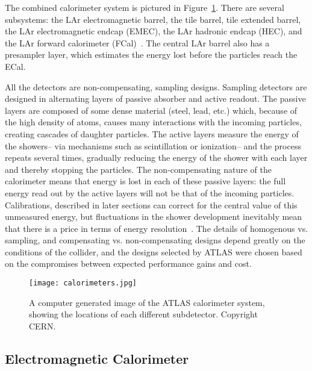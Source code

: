 The combined calorimeter system is pictured in Figure~\ref{fig:detector:calo}. There are several subsystems: the LAr electromagnetic barrel, the tile barrel, tile extended barrel, the LAr electromagnetic endcap (EMEC), the LAr hadronic endcap (HEC), and the LAr forward calorimeter (FCal)~\cite{ATLASPaper}. The central LAr barrel also has a presampler layer, which estimates the energy lost before the particles reach the ECal.

All the detectors are non-compensating, sampling designs. Sampling detectors are designed in alternating layers of passive absorber and active readout. The passive layers are composed of some dense material (steel, lead, etc.) which, because of the high density of atoms, causes many interactions with the incoming particles, creating cascades of daughter particles. The active layers measure the energy of the showers-- via mechanisms such as scintillation or ionization-- and the process repeats several times, gradually reducing the energy of the shower with each layer and thereby stopping the particles. The non-compensating nature of the calorimeter means that energy is lost in each of these passive layers: the full energy read out by the active layers will not be that of the incoming particles. Calibrations, described in later sections  can correct for the central value of this unmeasured energy, but fluctuations in the shower development inevitably mean that there is a price in terms of energy resolution~\cite{Wigmans}. The details of homogenous vs. sampling, and compensating vs. non-compensating designs depend greatly on the conditions of the collider, and the designs selected by ATLAS were chosen based on the compromises between expected performance gains and cost. 




\begin{figure}
\centering
\texttt{[image: calorimeters.jpg]}
\label{fig:detector:calo}
\caption{A computer generated image of the ATLAS calorimeter system, showing the locations of each different subdetector. Copyright CERN.}
\end{figure}



\subsection{Electromagnetic Calorimeter}

